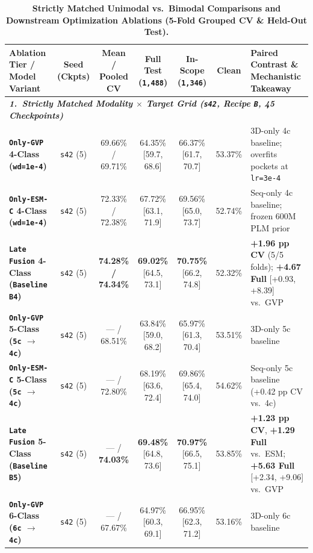 \documentclass[10pt,a4paper,twocolumn]{article}
\begin{document}
\begin{table}[t!]
  \centering
  \caption{\textbf{Strictly Matched Unimodal vs.\ Bimodal Comparisons and Downstream Optimization Ablations (5-Fold Grouped CV \& Held-Out Test).}}
  \label{tab:ablations}
  \scriptsize
  \setlength{\tabcolsep}{4pt}
  \begin{tabular}{lcccccl}
    \toprule
    \textbf{Ablation Tier / Model Variant} & \textbf{Seed (Ckpts)} & \textbf{Mean / Pooled CV} & \textbf{Full Test (\texttt{1,488})} & \textbf{In-Scope (\texttt{1,346})} & \textbf{Clean} & \textbf{Paired Contrast \& Mechanistic Takeaway} \\
    \midrule
    \multicolumn{7}{l}{\textit{\textbf{1.\ Strictly Matched Modality $\times$ Target Grid (\texttt{s42}, Recipe \texttt{B}, 45 Checkpoints)}}} \\
    \textbf{\texttt{Only-GVP} 4-Class (\texttt{wd=1e-4})} & \texttt{s42} (5) & 69.66\% / 69.71\% & 64.35\% [59.7, 68.6] & 66.37\% [61.7, 70.7] & 53.37\% & 3D-only 4c baseline; overfits pockets at \texttt{lr=3e-4} \\
    \textbf{\texttt{Only-ESM-C} 4-Class (\texttt{wd=1e-4})} & \texttt{s42} (5) & 72.33\% / 72.38\% & 67.72\% [63.1, 71.9] & 69.56\% [65.0, 73.7] & 52.74\% & Seq-only 4c baseline; frozen 600M PLM prior \\
    \textbf{\texttt{Late Fusion} 4-Class (\texttt{Baseline B4})} & \texttt{s42} (5) & \textbf{74.28\% / 74.34\%} & \textbf{69.02\%} [64.5, 73.1] & \textbf{70.75\%} [66.2, 74.8] & 52.32\% & \textbf{+1.96 pp CV} (5/5 folds); \textbf{+4.67 Full} [+0.93, +8.39] vs.\ GVP \\
    \textbf{\texttt{Only-GVP} 5-Class (\texttt{5c} $\to$ \texttt{4c})} & \texttt{s42} (5) & --- / 68.51\% & 63.84\% [59.0, 68.2] & 65.97\% [61.3, 70.4] & 53.51\% & 3D-only 5c baseline \\
    \textbf{\texttt{Only-ESM-C} 5-Class (\texttt{5c} $\to$ \texttt{4c})} & \texttt{s42} (5) & --- / 72.80\% & 68.19\% [63.6, 72.4] & 69.86\% [65.4, 74.0] & 54.62\% & Seq-only 5c baseline (+0.42 pp CV vs.\ 4c) \\
    \textbf{\texttt{Late Fusion} 5-Class (\texttt{Baseline B5})} & \texttt{s42} (5) & --- / \textbf{74.03\%} & \textbf{69.48\%} [64.8, 73.6] & \textbf{70.97\%} [66.5, 75.1] & 53.85\% & \textbf{+1.23 pp CV}, \textbf{+1.29 Full} vs.\ ESM; \textbf{+5.63 Full} [+2.34, +9.06] vs.\ GVP \\
    \textbf{\texttt{Only-GVP} 6-Class (\texttt{6c} $\to$ \texttt{4c})} & \texttt{s42} (5) & --- / 67.67\% & 64.97\% [60.3, 69.1] & 66.95\% [62.3, 71.2] & 53.16\% & 3D-only 6c baseline \\

\end{tabular}
\end{table}
\end{document}
